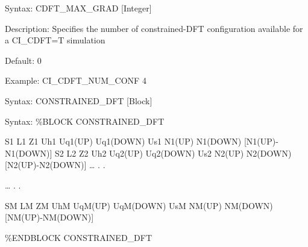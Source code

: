 \documentclass[letterpaper,10pt,english]{sphinxmanual}
\begin{document}

Syntax: CDFT\_MAX\_GRAD {[}Integer{]}

Description: Specifies the number of constrained-DFT configuration
available for a CI\_CDFT=T simulation

Default: 0

Example: CI\_CDFT\_NUM\_CONF 4


Syntax: CONSTRAINED\_DFT {[}Block{]}

Syntax: \%BLOCK CONSTRAINED\_DFT

S1 L1 Z1 Uh1 Uq1(UP) Uq1(DOWN) Us1 N1(UP) N1(DOWN) {[}N1(UP)-N1(DOWN){]} S2
L2 Z2 Uh2 Uq2(UP) Uq2(DOWN) Us2 N2(UP) N2(DOWN) {[}N2(UP)-N2(DOWN){]} …
. .

… . .

SM LM ZM UhM UqM(UP) UqM(DOWN) UsM NM(UP) NM(DOWN) {[}NM(UP)-NM(DOWN){]}

\%ENDBLOCK CONSTRAINED\_DFT
\end{document}
